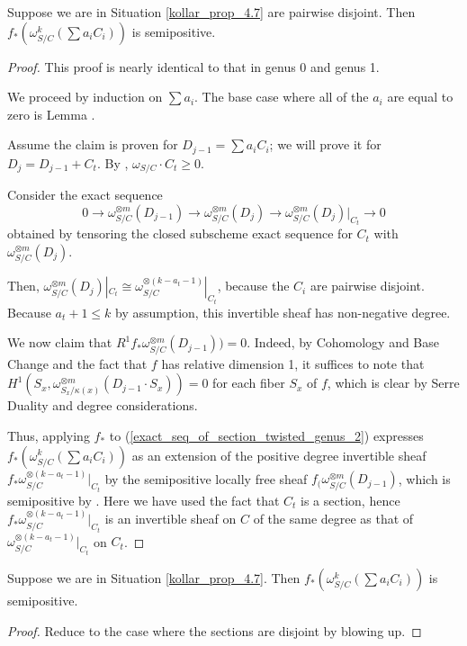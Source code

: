 \begin{lemma}\label{inductive_step_genus_2}
Suppose we are in Situation \ref{kollar_prop_4.7} are pairwise disjoint.
Then $f_{*}(\omega_{S/C}^{k}(\sum a_iC_i))$ is semipositive.
\end{lemma}
\begin{proof}
This proof is nearly identical to that in genus 0 and genus 1.

We proceed by induction on $\sum a_i$. 
The base case where all of the $a_i$ are equal to zero is Lemma .

Assume the claim is proven for $D_{j-1}=\sum a_iC_i$; we will prove it for $D_{j}=D_{j-1}+C_t$.
By , $\omega_{S/C}\cdot C_t\ge0$.

Consider the exact sequence
\begin{equation*}\label{exact_seq_of_section_twisted_genus_2}
0\to\omega_{S/C}^{\otimes m}(D_{j-1})\to\omega_{S/C}^{\otimes m}(D_j)\to \omega_{S/C}^{\otimes m}(D_j)|_{C_t}\to0
\end{equation*}
obtained by tensoring the closed subscheme exact sequence for $C_t$ with $\omega_{S/C}^{\otimes m}(D_j)$.

Then, $\omega_{S/C}^{\otimes m}(D_j)|_{C_t}\cong \omega_{S/C}^{\otimes (k-a_{t}-1)}|_{C_t}$, because the $C_i$ are pairwise disjoint.
Because $a_{t}+1\le k$ by assumption, this invertible sheaf has non-negative degree.

We now claim that $R^{1}f_{*}\omega_{S/C}^{\otimes m}(D_{j-1}))=0$.
Indeed, by Cohomology and Base Change and the fact that $f$ has relative dimension 1, it suffices to note that $H^{1}(S_x,\omega_{S_x/\kappa(x)}^{\otimes m}(D_{j-1}\cdot S_x))=0$ for each fiber $S_x$ of $f$, which is clear by Serre Duality and degree considerations.


Thus, applying $f_{*}$ to (\ref{exact_seq_of_section_twisted_genus_2}) expresses $f_{*}(\omega_{S/C}^{k}(\sum a_iC_i))$ as an extension of the positive degree invertible sheaf $f_{*}\omega_{S/C}^{\otimes (k-a_{t}-1)}|_{C_t}$ by the semipositive locally free sheaf $f_{(}\omega_{S/C}^{\otimes m}(D_{j-1})$, which is semipositive by .
Here we have used the fact that $C_t$ is a section, hence $f_{*}\omega_{S/C}^{\otimes (k-a_{t}-1)}|_{C_t}$ is an invertible sheaf on $C$ of the same degree as that of $\omega_{S/C}^{\otimes (k-a_{t}-1)}|_{C_t}$ on $C_t$.
\end{proof}



\begin{lemma}
Suppose we are in Situation \ref{kollar_prop_4.7}.
Then $f_{*}(\omega_{S/C}^{k}(\sum a_iC_i))$ is semipositive.
\end{lemma}
\begin{proof}
Reduce to the case where the sections are disjoint by blowing up.
\end{proof}




